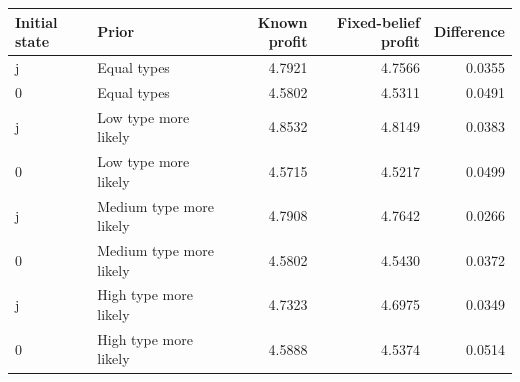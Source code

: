\begin{tabular}{llrrr}\hline
Initial state & Prior & Known profit & Fixed-belief profit & Difference\\\hline
j & Equal types & 4.7921 & 4.7566 & 0.0355 \\
0 & Equal types & 4.5802 & 4.5311 & 0.0491 \\
j & Low type more likely & 4.8532 & 4.8149 & 0.0383 \\
0 & Low type more likely & 4.5715 & 4.5217 & 0.0499 \\
j & Medium type more likely & 4.7908 & 4.7642 & 0.0266 \\
0 & Medium type more likely & 4.5802 & 4.5430 & 0.0372 \\
j & High type more likely & 4.7323 & 4.6975 & 0.0349 \\
0 & High type more likely & 4.5888 & 4.5374 & 0.0514 \\
\hline\end{tabular}
